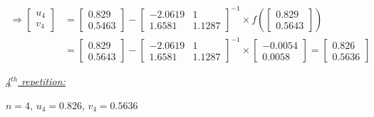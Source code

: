 \documentclass[a4paper,11pt]{article}
\begin{document}
\[ \begin{array}{ll}
    \Rightarrow  \begin{bmatrix} u_{4} \\ v_{4} \end{bmatrix} &= \begin{bmatrix} 0.829 \\ 0.5463  \end{bmatrix} - \begin{bmatrix} -2.0619 & 1  \\ 1.6581 & 1.1287  \end{bmatrix}^{-1} \times f\left(\begin{bmatrix} 0.829 \\ 0.5643 \end{bmatrix}\right) \\
    &= \begin{bmatrix} 0.829 \\ 0.5643  \end{bmatrix} - \begin{bmatrix} -2.0619 & 1  \\ 1.6581 & 1.1287  \end{bmatrix}^{-1} \times \begin{bmatrix} -0.0054 \\ 0.0058 \end{bmatrix} = \begin{bmatrix} 0.826 \\ 0.5636 \end{bmatrix} 
\end{array} \]

\underline{\textit{4$^{th}$ repetition:}}

$n = 4$, $u_4 = 0.826$, $v_4 = 0.5636$
\end{document}
